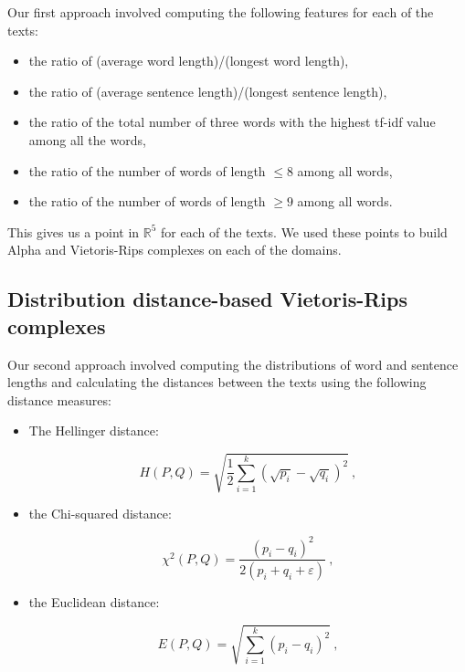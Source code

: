 \documentclass[12pt,a4paper]{amsart}
\def\R{\mathbb R}
\begin{document}
Our first approach involved computing the following features for each of the
texts:

\begin{itemize}
  \item the ratio of (average word length)/(longest word length),
  \item the ratio of (average sentence length)/(longest sentence length),
  \item the ratio of the total number of three words with the highest tf-idf
    value among all the words,
  \item the ratio of the number of words of length $\le 8$ among all words,
  \item the ratio of the number of words of length $\ge 9$ among all words.
\end{itemize}

This gives us a point in $\R^5$ for each of the texts. We used these points to
build Alpha and Vietoris-Rips complexes on each of the domains.

\subsection{Distribution distance-based Vietoris-Rips complexes}

Our second approach involved computing the distributions of word and sentence
lengths and calculating the distances between the texts using the following
distance measures:

\begin{itemize}
\item The Hellinger distance:

\begin{equation*}
  H(P,Q) = \sqrt{\frac{1}{2} \sum_{i=1}^k\left(\sqrt{p_i} -
    \sqrt{q_i}\right)^2}\ ,
\end{equation*}

\item the Chi-squared distance:

\begin{equation*}
  \chi^2(P,Q) = \frac{(p_i - q_i)^2}{2(p_i + q_i + \varepsilon)}\ ,
\end{equation*}

\item the Euclidean distance:

\begin{equation*}
  E(P,Q) = \sqrt{\sum_{i=1}^k\left(p_i - q_i\right)^2}\ ,
\end{equation*}
\end{itemize}
\end{document}
